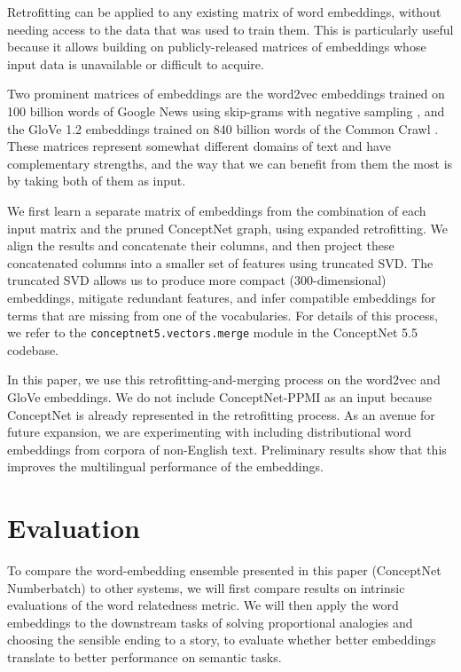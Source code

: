 \documentclass[letterpaper]{article}
\begin{document}
Retrofitting can be applied to any existing matrix of word embeddings, without
needing access to the data that was used to train them. This is particularly
useful because it allows building on publicly-released matrices of embeddings
whose input data is unavailable or difficult to acquire.

Two prominent matrices of embeddings are the word2vec embeddings trained on 100
billion words of Google News using skip-grams with negative sampling
\cite{mikolov2013word2vec}, and the GloVe 1.2 embeddings trained on 840 billion
words of the Common Crawl \cite{pennington2014glove}. These matrices represent
somewhat different domains of text and have complementary strengths, and the
way that we can benefit from them the most is by taking both of them as input.

We first learn a separate matrix of embeddings from the combination of each
input matrix and the pruned ConceptNet graph, using expanded retrofitting. We
align the results and concatenate their columns, and then project these
concatenated columns into a smaller set of features using truncated SVD. The
truncated SVD allows us to produce more compact (300-dimensional) embeddings,
mitigate redundant features, and infer compatible embeddings for terms that
are missing from one of the vocabularies. For details of this process, we
refer to the \texttt{conceptnet5.vectors.merge} module in the ConceptNet 5.5
codebase.

In this paper, we use this retrofitting-and-merging process on the
word2vec and GloVe embeddings. We do not include ConceptNet-PPMI as an input
because ConceptNet is already represented in the retrofitting process. As an
avenue for future expansion, we are experimenting with including distributional
word embeddings from corpora of non-English text. Preliminary results show that
this improves the multilingual performance of the embeddings.

\section{Evaluation}

To compare the word-embedding ensemble presented in this paper (ConceptNet
Numberbatch) to other systems, we will first compare results on intrinsic
evaluations of the word relatedness metric. We will then apply the word
embeddings to the downstream tasks of solving proportional analogies and
choosing the sensible ending to a story, to evaluate whether better embeddings
translate to better performance on semantic tasks.
\end{document}
